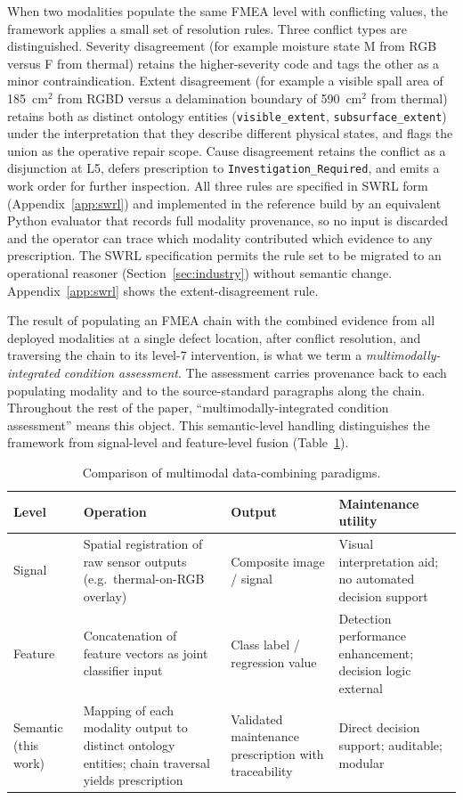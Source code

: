 \documentclass[11pt,a4paper]{article}
\begin{document}
When two modalities populate the same FMEA level with conflicting values, the framework applies a small set of resolution rules. Three conflict types are distinguished. Severity disagreement (for example moisture state M from RGB versus F from thermal) retains the higher-severity code and tags the other as a minor contraindication. Extent disagreement (for example a visible spall area of 185~cm$^2$ from RGBD versus a delamination boundary of 590~cm$^2$ from thermal)
retains both as distinct ontology entities (\texttt{visible\_extent}, \texttt{subsurface\_extent}) under the interpretation that they describe different physical states, and flags the union as the operative repair scope. Cause disagreement retains the conflict as a disjunction at L5, defers prescription to \texttt{Investigation\_Required}, and emits a work order for further inspection. All three rules are specified in SWRL form (Appendix~\ref{app:swrl}) and implemented in the reference build by an equivalent Python evaluator that records full modality provenance, so no input is discarded and the operator can trace which modality contributed which evidence to any prescription. The SWRL specification permits the rule set to be migrated to an operational reasoner (Section~\ref{sec:industry}) without semantic change. Appendix~\ref{app:swrl} shows the extent-disagreement rule.

The result of populating an FMEA chain with the combined evidence from all deployed modalities at a single defect location, after conflict resolution, and traversing the chain to its level-7 intervention, is what we term a \emph{multimodally-integrated condition assessment}. The assessment carries provenance back to each populating modality and to the source-standard paragraphs along the chain. Throughout the rest of the paper, ``multimodally-integrated condition assessment'' means this object. This semantic-level handling distinguishes the framework from signal-level and feature-level fusion (Table~\ref{tab:fusion_levels}).

\begin{table}[htbp]
\centering
\caption{Comparison of multimodal data-combining paradigms.}
\label{tab:fusion_levels}
\begin{tabularx}{\textwidth}{p{2.4cm} X X X}
\toprule
\textbf{Level} & \textbf{Operation} & \textbf{Output} &
  \textbf{Maintenance utility} \\
\midrule
Signal & Spatial registration of raw sensor outputs (e.g.\ thermal-on-RGB
  overlay) & Composite image / signal & Visual interpretation aid;
  no automated decision support \\
Feature & Concatenation of feature vectors as joint classifier input &
  Class label / regression value & Detection performance enhancement;
  decision logic external \\
Semantic (this work) & Mapping of each modality output to distinct
  ontology entities; chain traversal yields prescription &
  Validated maintenance prescription with traceability &
  Direct decision support; auditable; modular \\
\bottomrule
\end{tabularx} 
\end{table}
\end{document}
